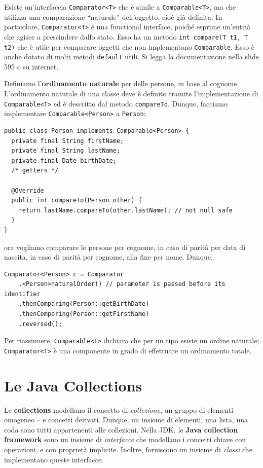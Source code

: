 \documentclass[\fontsizeclass,twocolumn]{\classname}
\theoremstyle{definition}
\theoremstyle{definition}
\begin{document}
Esiste un'interfaccia \texttt{Comparator<T>} che è simile a
\texttt{Comparable<T>}, ma che utilizza una comparazione ``naturale''
dell'oggetto, cioè già definita. In particolare, \texttt{Comparator<T>} è una
functional interface, poiché esprime un'entità che agisce a prescindere dallo
stato. Esso ha un metodo \texttt{int compare(T t1, T t2)} che è utile per
comparare oggetti che non implementano \texttt{Comparable}. Esso è anche dotato
di molti metodi \texttt{default} utili. Si legga la documentazione nella slide
595 o su internet.

Definiamo l'\textbf{ordinamento naturale} per delle persone, in base al
cognome. L'ordinamento naturale di una classe deve è definito tramite
l'implementazione di \texttt{Comparable<T>} ed è descritto dal metodo
\texttt{compareTo}. Dunque, facciamo implementare \texttt{Comparable<Person>} a
\texttt{Person}:

\begin{lstlisting}
public class Person implements Comparable<Person> {
  private final String firstName;
  private final String lastName;
  private final Date birthDate;
  /* getters */
  
  @Override
  public int compareTo(Person other) {
    return lastName.compareTo(other.lastName); // not null safe
  }
}
\end{lstlisting}

ora vogliamo comparare le persone per cognome, in caso di parità per data di
nascita, in caso di parità per cognome, alla fine per nome. Dunque,

\begin{lstlisting}
Comparator<Person> c = Comparator
    .<Person>naturalOrder() // parameter is passed before its identifier
    .thenComparing(Person::getBirthDate)
    .thenComparing(Person::getFirstName)
    .reversed();
\end{lstlisting}

Per riassumere, \texttt{Comparable<T>} dichiara che per un tipo esiste un
ordine naturale; \texttt{Comparator<T>} è una componente in grado di effettuare
un ordinamento totale.


\chapter{Le Java Collections}

Le \textbf{collections} modellano il concetto di \emph{collezione}, un gruppo
di elementi omogeneo -- e concetti derivati. Dunque, un insieme di elementi,
una lista, una coda sono tutti appartenenti alle collezioni. Nella JDK, le
\textbf{Java collection framework} sono un insieme di \emph{interfacce} che
modellano i concetti chiave con operazioni, e con proprietà implicite. Inoltre,
forniscono un insieme di \emph{classi} che implementano queste interfacce.
\end{document}
